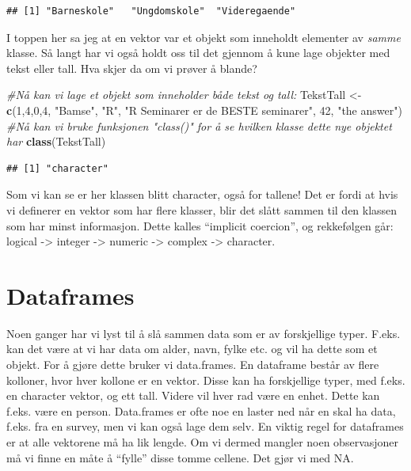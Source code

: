 \documentclass[
]{article}
\newenvironment{Shaded}{\begin{snugshade}}{\end{snugshade}}
\newcommand{\CommentTok}[1]{\textcolor[rgb]{0.56,0.35,0.01}{\textit{#1}}}
\newcommand{\DecValTok}[1]{\textcolor[rgb]{0.00,0.00,0.81}{#1}}
\newcommand{\KeywordTok}[1]{\textcolor[rgb]{0.13,0.29,0.53}{\textbf{#1}}}
\newcommand{\NormalTok}[1]{#1}
\newcommand{\StringTok}[1]{\textcolor[rgb]{0.31,0.60,0.02}{#1}}
\begin{document}
\begin{verbatim}
## [1] "Barneskole"   "Ungdomskole"  "Videregaende"
\end{verbatim}

I toppen her sa jeg at en vektor var et objekt som inneholdt elementer
av \emph{samme} klasse. Så langt har vi også holdt oss til det gjennom å
kune lage objekter med tekst eller tall. Hva skjer da om vi prøver å
blande?

\begin{Shaded}
\begin{Highlighting}[]
\CommentTok{#Nå kan vi lage et objekt som inneholder både tekst og tall:}
\NormalTok{TekstTall <-}\StringTok{ }\KeywordTok{c}\NormalTok{(}\DecValTok{1}\NormalTok{,}\DecValTok{4}\NormalTok{,}\DecValTok{0}\NormalTok{,}\DecValTok{4}\NormalTok{, }\StringTok{"Bamse"}\NormalTok{, }\StringTok{"R"}\NormalTok{, }\StringTok{"R Seminarer er de BESTE seminarer"}\NormalTok{, }\DecValTok{42}\NormalTok{, }\StringTok{"the answer"}\NormalTok{)}
\CommentTok{#Nå kan vi bruke funksjonen "class()" for å se hvilken klasse dette nye objektet har}
\KeywordTok{class}\NormalTok{(TekstTall)}
\end{Highlighting}
\end{Shaded}

\begin{verbatim}
## [1] "character"
\end{verbatim}

Som vi kan se er her klassen blitt character, også for tallene! Det er
fordi at hvis vi definerer en vektor som har flere klasser, blir det
slått sammen til den klassen som har minst informasjon. Dette kalles
``implicit coercion'', og rekkefølgen går: logical -\textgreater{}
integer -\textgreater{} numeric -\textgreater{} complex -\textgreater{}
character.

\hypertarget{dataframes}{%
\section{Dataframes}\label{dataframes}}

Noen ganger har vi lyst til å slå sammen data som er av forskjellige
typer. F.eks. kan det være at vi har data om alder, navn, fylke etc. og
vil ha dette som et objekt. For å gjøre dette bruker vi data.frames. En
dataframe består av flere kolloner, hvor hver kollone er en vektor.
Disse kan ha forskjellige typer, med f.eks. en character vektor, og ett
tall. Videre vil hver rad være en enhet. Dette kan f.eks. være en
person. Data.frames er ofte noe en laster ned når en skal ha data,
f.eks. fra en survey, men vi kan også lage dem selv. En viktig regel for
dataframes er at alle vektorene må ha lik lengde. Om vi dermed mangler
noen observasjoner må vi finne en måte å ``fylle'' disse tomme cellene.
Det gjør vi med NA.
\end{document}
